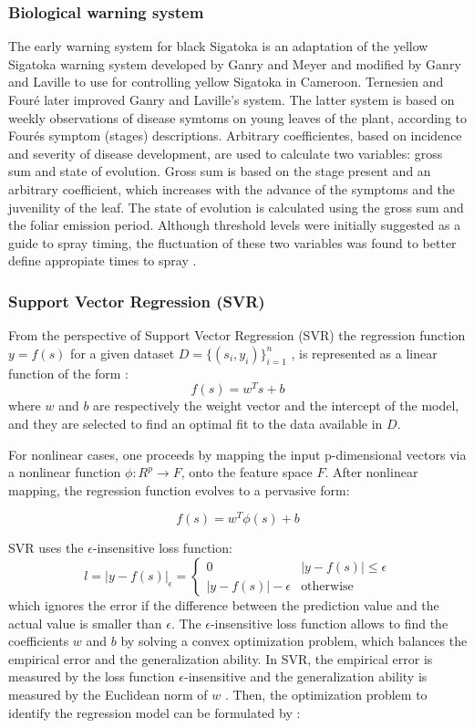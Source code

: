 \documentclass[review,authoryear,english]{elsarticle}
\begin{document}
\subsubsection{Biological warning system}

The early warning system for black Sigatoka is an adaptation of the yellow Sigatoka warning system developed by Ganry and Meyer and modified by Ganry and Laville to use for controlling yellow Sigatoka in Cameroon. Ternesien and Fouré  later improved Ganry and Laville's system.
%
The latter system is based on weekly observations of disease symtoms on young leaves of the plant, according to Fourés symptom (stages) descriptions. Arbitrary coefficientes, based on incidence and severity of disease development, are used to calculate two variables: gross sum and state of evolution.
%
Gross sum is based on the stage present and an arbitrary coefficient, which increases with the advance of the symptoms and the juvenility of the leaf. The state of evolution is calculated using the gross sum and the foliar emission period.
%
Although threshold levels were initially suggested as a guide to spray timing, the fluctuation of these two variables was found to better define appropiate times to spray \citep{Marinetal2003}.

\subsubsection{Support Vector Regression (SVR)}
From the perspective of Support Vector Regression (SVR) the regression function $y = f(s)$ for a given dataset $D=\{(s_i,y_i)\}_{i=1}^n$ , is represented as a linear function of the form \citep{Wei2013}:
$$f(s)=w^Ts+b$$
where $w$ and $b$ are respectively the weight vector and the intercept of the model, and they are selected to find an optimal fit to the data available in $D$.

For nonlinear cases, one proceeds by mapping the input p-dimensional vectors via a nonlinear function $\phi : R^p\rightarrow F$, onto the feature space $F$.  After nonlinear mapping, the regression function evolves to a pervasive form:

$$f(s)=w^T \phi (s)+b$$

SVR uses the $\epsilon$-insensitive loss function:
\begin{equation*}
l= {\left| y - f(s) \right| }_{\epsilon } = 
\begin{cases}
   0 & {\left| y - f(s) \right| } \leq \epsilon \\
   \left| y - f(s) \right| - \epsilon & \text{otherwise}
\end{cases}
\end{equation*}
which ignores the error if the difference between the prediction value and the actual value is smaller than $\epsilon$.
%
The $\epsilon$-insensitive loss function allows to find the coefficients $w$ and $b$ by solving a convex optimization problem, which balances the empirical error and the generalization ability.
%
In SVR, the empirical error is measured by the loss function $\epsilon$-insensitive and the generalization ability is measured by the Euclidean norm of $w$ \citep{Cristiani2005}.
%
Then, the optimization problem to identify the regression model can be
formulated by \citep{Wei2013}: 
\end{document}
